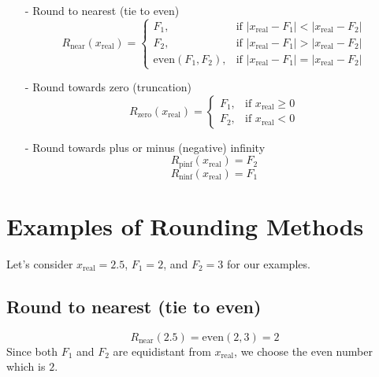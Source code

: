 \documentclass[12pt,openany]{book}
\begin{document}
			      	\begin{itemize}
			      		\item[-] Round to nearest (tie to even)
			      		      \[ R_{\text{near}}(x_{\text{real}}) = 
			      		      	\begin{cases} 
			      		      		F_1,                   & \text{if } |x_{\text{real}} - F_1| < |x_{\text{real}} - F_2| \\
			      		      		F_2,                   & \text{if } |x_{\text{real}} - F_1| > |x_{\text{real}} - F_2| \\
			      		      		\text{even}(F_1, F_2), & \text{if } |x_{\text{real}} - F_1| = |x_{\text{real}} - F_2| 
			      		      	\end{cases}
			      		      \]
			      		          
			      		\item[-] Round towards zero (truncation)
			      		      \[ R_{\text{zero}}(x_{\text{real}}) = 
			      		      	\begin{cases} 
			      		      		F_1, & \text{if } x_{\text{real}} \geq 0 \\
			      		      		F_2, & \text{if } x_{\text{real}} < 0    
			      		      	\end{cases}
			      		      \]
			      		          
			      		\item[-] Round towards plus or minus (negative) infinity
			      		      \[ R_{\text{pinf}}(x_{\text{real}}) = F_2 \]
			      		      \[ R_{\text{ninf}}(x_{\text{real}}) = F_1 \]
			      	\end{itemize}
			      	
			      	\section*{Examples of Rounding Methods}
			      	
			      	Let's consider \( x_{\text{real}} = 2.5 \), \( F_1 = 2 \), and \( F_2 = 3 \) for our examples.
			      	
			      	\subsection*{Round to nearest (tie to even)}
			      	\[ R_{\text{near}}(2.5) = \text{even}(2, 3) = 2 \]
			      	Since both \( F_1 \) and \( F_2 \) are equidistant from \( x_{\text{real}} \), we choose the even number which is \( 2 \).
			      	
\end{document}
